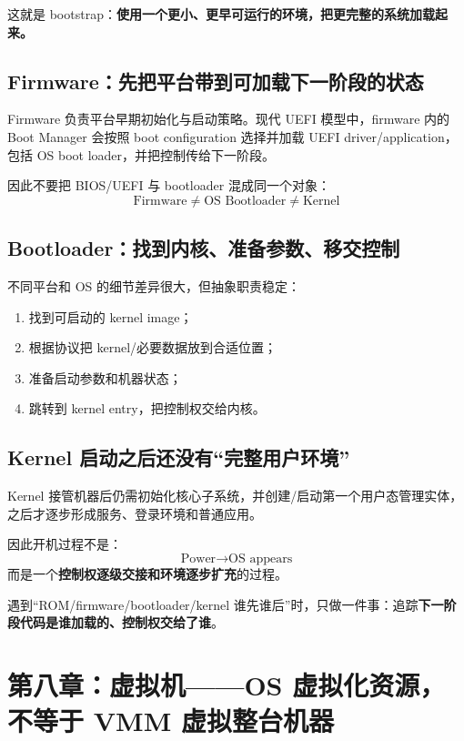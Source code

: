 \documentclass[11pt,a4paper]{ctexart}
\newcommand{\kw}[1]{\textbf{#1}}
\begin{document}
这就是 bootstrap：\kw{使用一个更小、更早可运行的环境，把更完整的系统加载起来。}

\subsection{Firmware：先把平台带到可加载下一阶段的状态}

Firmware 负责平台早期初始化与启动策略。现代 UEFI 模型中，firmware 内的 Boot Manager 会按照 boot configuration 选择并加载 UEFI driver/application，包括 OS boot loader，并把控制传给下一阶段。

因此不要把 BIOS/UEFI 与 bootloader 混成同一个对象：
\[
\boxed{\text{Firmware}\neq\text{OS Bootloader}\neq\text{Kernel}}
\]

\subsection{Bootloader：找到内核、准备参数、移交控制}

不同平台和 OS 的细节差异很大，但抽象职责稳定：
\begin{enumerate}
  \item 找到可启动的 kernel image；
  \item 根据协议把 kernel/必要数据放到合适位置；
  \item 准备启动参数和机器状态；
  \item 跳转到 kernel entry，把控制权交给内核。
\end{enumerate}

\subsection{Kernel 启动之后还没有“完整用户环境”}

Kernel 接管机器后仍需初始化核心子系统，并创建/启动第一个用户态管理实体，之后才逐步形成服务、登录环境和普通应用。

因此开机过程不是：
\[
\text{Power}\rightarrow\text{OS appears}
\]
而是一个\kw{控制权逐级交接和环境逐步扩充}的过程。

\begin{exam}[引导题信号]
遇到“ROM/firmware/bootloader/kernel 谁先谁后”时，只做一件事：追踪\kw{下一阶段代码是谁加载的、控制权交给了谁}。
\end{exam}

\section{第八章：虚拟机——OS 虚拟化资源，不等于 VMM 虚拟整台机器}
\end{document}
